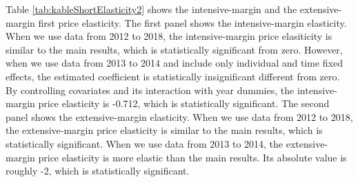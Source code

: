 \documentclass[ review  , 3p ]{elsarticle}
\begin{document}
  Table \ref{tab:kableShortElasticity2} shows the intensive-margin and the extensive-margin first price elasticity.
  The first panel shows the intensive-margin elasticity.
  When we use data from 2012 to 2018, the intensive-margin price elasiticity is similar to the main results,
  which is statistically significant from zero.
  However, when we use data from 2013 to 2014 and include only individual and time fixed effects,
  the estimated coefficient is statistically insignificant different from zero.
  By controlling covariates and its interaction with year dummies,
  the intensive-margin price elasticity is -0.712, which is statistically significant.
  The second panel shows the extensive-margin elasticity.
  When we use data from 2012 to 2018, the extensive-margin price elasticity is similar to the main results,
  which is statistically significant.
  When we use data from 2013 to 2014, the extensive-margin price elasticity is more elastic than the main results.
  Its absolute value is roughly -2, which is statistically significant.
\end{document}

